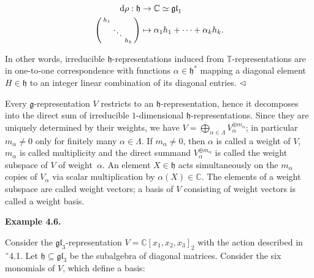 \[\begin{aligned}
\displaystyle\textnormal{d}\rho:\mathfrak{h} & \displaystyle\to\mathbb{C}\simeq\mathfrak{gl}_{1} \\
\displaystyle\left(\begin{smallmatrix}h_{1}&&\\ &\ddots&\\ &&h_{k}\end{smallmatrix}\right) & \displaystyle\mapsto\alpha_{1}h_{1}+\cdots+\alpha_{k}h_{k}.
\end{aligned}\]


In other words, irreducible $\mathfrak{h}$-representations induced from $\mathbb{T}$-representations are in one-to-one correspondence with functions $\alpha\in\mathfrak{h}^{*}$ mapping a diagonal element $H\in\mathfrak{h}$ to an integer linear combination of its diagonal entries. $\hfill\vartriangleleft$





Every $\mathfrak{g}$-representation $V$ restricts to an $\mathfrak{h}$-representation, hence it decomposes into the direct sum of irreducible $1$-dimensional $\mathfrak{h}$-representations. Since they are uniquely determined by their weights, we have $V=\bigoplus_{\alpha\in\Lambda}V_{\alpha}^{\oplus m_{\alpha}}$; in particular $m_{\alpha}\neq 0$ only for finitely many $\alpha\in\Lambda$. If $m_{\alpha}\neq 0$, then $\alpha$ is called a weight of $V$, $m_{\alpha}$ is called multiplicity and the direct summand $V_{\alpha}^{\oplus m_{\alpha}}$ is called the weight subspace of $V$ of weight $\alpha$. An element $X\in\mathfrak{h}$ acts simultaneously on the $m_{\alpha}$ copies of $V_{\alpha}$ via scalar multiplication by $\alpha(X)\in\mathbb{C}$. The elements of a weight subspace are called weight vectors; a basis of $V$ consisting of weight vectors is called a weight basis.





\par\medskip\noindent\textbf{Example 4.6.}\par



Consider the $\mathfrak{gl}_{3}$-representation $V=\mathbb{C}[x_{1},x_{2},x_{3}]_{2}$ with the action described in ˜4.1. Let $\mathfrak{h}\subseteq\mathfrak{gl}_{3}$ be the subalgebra of diagonal matrices.
Consider the six monomials of $V$, which define a basis:



